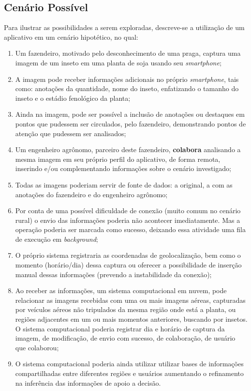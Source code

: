 \documentclass[12pt]{article}
\begin{document}
\subsection{Cenário Possível}
\label{subsec:cenario_possivel}

Para ilustrar as possibilidades a serem exploradas, descreve-se a utilização de um aplicativo em um cenário hipotético, no qual:

\begin{enumerate}
	\item Um fazendeiro, motivado pelo desconhecimento de uma praga, captura uma imagem de um inseto em uma planta de soja usando seu \textit{smartphone};
	\item A imagem pode receber informações adicionais no próprio \textit{smartphone}, tais como: anotações da quantidade, nome do inseto, enfatizando o tamanho do inseto e o estádio fenológico da planta;
	\item Ainda na imagem, pode ser possível a inclusão de anotações ou destaques em pontos que pudessem ser circulados, pelo fazendeiro, demonstrando pontos de atenção que pudessem ser analisados;
	\item Um engenheiro agrônomo, parceiro deste fazendeiro, \textbf{colabora} analisando a mesma imagem em seu próprio perfil do aplicativo, de forma remota, inserindo e/ou complementando informações sobre o cenário investigado;
	\item Todas as imagens poderiam servir de fonte de dados: a original, a com as anotações do fazendeiro e do engenheiro agrônomo;
	\item Por conta de uma possível dificuldade de conexão (muito comum no cenário rural) o envio das informações poderia não acontecer imediatamente. Mas a operação poderia ser marcada como sucesso, deixando essa atividade uma fila de execução em \textit{background};
	\item O próprio sistema registraria as coordenadas de geolocalização, bem como o momento (horário/dia) dessa captura ou oferecer a possibilidade de inserção manual dessas informações (prevendo a instabilidade da conexão);
	\item Ao receber as informações, um sistema computacional em nuvem, pode relacionar as imagens recebidas com uma ou mais imagens aéreas, capturadas por veículos aéreos não tripulados da mesma região onde está a planta, ou regiões adjacentes em um ou mais momentos anteriores, buscando por insetos. O sistema computacional poderia registrar dia e horário de captura da imagem, de modificação, de envio com sucesso, de colaboração, de usuário que colaborou;
	\item O sistema computacional poderia ainda utilizar utilizar bases de informações compartilhadas entre diferentes regiões e usuários aumentando o refinamento na inferência das informações de apoio a decisão.
\end{enumerate}
\end{document}
